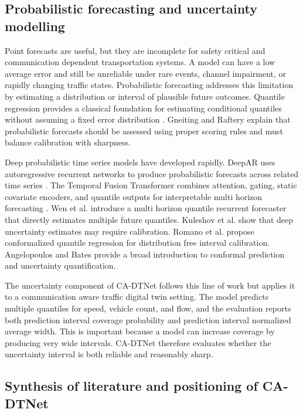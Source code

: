 \documentclass[pdflatex,sn-mathphys-num]{sn-jnl}%
\theoremstyle{thmstyleone}%
\theoremstyle{thmstyletwo}%
\theoremstyle{thmstylethree}%
\begin{document}
\subsection{Probabilistic forecasting and uncertainty modelling}

Point forecasts are useful, but they are incomplete for safety critical and communication dependent transportation systems. A model can have a low average error and still be unreliable under rare events, channel impairment, or rapidly changing traffic states. Probabilistic forecasting addresses this limitation by estimating a distribution or interval of plausible future outcomes. Quantile regression provides a classical foundation for estimating conditional quantiles without assuming a fixed error distribution \cite{koenker1978quantile}. Gneiting and Raftery \cite{gneiting2007scoring} explain that probabilistic forecasts should be assessed using proper scoring rules and must balance calibration with sharpness.

Deep probabilistic time series models have developed rapidly. DeepAR uses autoregressive recurrent networks to produce probabilistic forecasts across related time series \cite{salinas2020deepar}. The Temporal Fusion Transformer combines attention, gating, static covariate encoders, and quantile outputs for interpretable multi horizon forecasting \cite{lim2021tft}. Wen et al. \cite{wen2017mqrf} introduce a multi horizon quantile recurrent forecaster that directly estimates multiple future quantiles. Kuleshov et al. \cite{kuleshov2018calibration} show that deep uncertainty estimates may require calibration. Romano et al. \cite{romano2019cqr} propose conformalized quantile regression for distribution free interval calibration. Angelopoulos and Bates \cite{angelopoulos2023conformal} provide a broad introduction to conformal prediction and uncertainty quantification.

The uncertainty component of CA-DTNet follows this line of work but applies it to a communication aware traffic digital twin setting. The model predicts multiple quantiles for speed, vehicle count, and flow, and the evaluation reports both prediction interval coverage probability and prediction interval normalized average width. This is important because a model can increase coverage by producing very wide intervals. CA-DTNet therefore evaluates whether the uncertainty interval is both reliable and reasonably sharp.

\subsection{Synthesis of literature and positioning of CA-DTNet}
\end{document}
